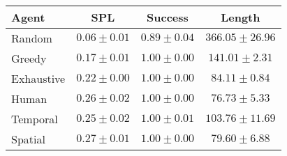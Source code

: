 \begin{tabular}{lccc}
    \toprule
    Agent & SPL & Success & Length \\
    \midrule
    Random & $0.06 \pm 0.01$ & $0.89 \pm 0.04$ & $366.05 \pm 26.96$\\
    Greedy & $0.17 \pm 0.01$ & $1.00 \pm 0.00$ & $141.01 \pm 2.31$\\
    Exhaustive & $0.22 \pm 0.00$ & $1.00 \pm 0.00$ & $84.11 \pm 0.84$\\
    Human & $0.26 \pm 0.02$ & $1.00 \pm 0.00$ & $76.73 \pm 5.33$\\
    Temporal & $0.25 \pm 0.02$ & $1.00 \pm 0.01$ & $103.76 \pm 11.69$\\
    Spatial & $0.27 \pm 0.01$ & $1.00 \pm 0.00$ & $79.60 \pm 6.88$\\
    \bottomrule
\end{tabular}